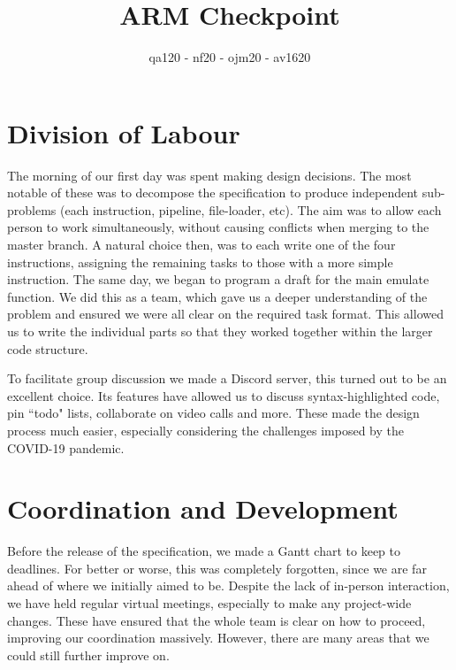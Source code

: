 \documentclass[]{article}
\begin{document}
\title{ARM Checkpoint}
\author{qa120 - nf20 - ojm20 - av1620}

\maketitle

\section*{Division of Labour}


The morning of our first day was spent making design decisions. The most notable of these was to decompose the specification to produce independent sub-problems (each instruction, pipeline, file-loader, etc). The aim was to allow each person to work simultaneously, without causing conflicts when merging to the master branch. A natural choice then, was to each write one of the four instructions, assigning the remaining tasks to those with a more simple instruction. The same day, we began to program a draft for the main emulate function. We did this as a team, which gave us a deeper understanding of the problem and ensured we were all clear on the required task format. This allowed us to write the individual parts so that they worked together within the larger code structure.

\vspace{3mm}

To facilitate group discussion we made a Discord server, this turned out to be an excellent choice. Its features have allowed us to discuss syntax-highlighted code, pin ``todo" lists, collaborate on video calls and more. These made the design process much easier, especially considering the challenges imposed by the COVID-19 pandemic.


\section*{Coordination and Development}
Before the release of the specification, we made a Gantt chart to keep to deadlines. For better or worse, this was completely forgotten, since we are far ahead of where we initially aimed to be. Despite the lack of in-person interaction, we have held regular virtual meetings, especially to make any project-wide changes. These have ensured that the whole team is clear on how to proceed, improving our coordination massively. However, there are many areas that we could still further improve on.

\vspace{3mm}
\end{document}
